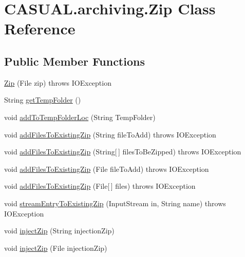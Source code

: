 \hypertarget{classCASUAL_1_1archiving_1_1Zip}{\section{C\-A\-S\-U\-A\-L.\-archiving.\-Zip Class Reference}
\label{classCASUAL_1_1archiving_1_1Zip}
}
\subsection*{Public Member Functions}
\begin{DoxyCompactItemize}
\item 
\hyperlink{classCASUAL_1_1archiving_1_1Zip_af739cb60ce5a0d3a5348cb9e679ceba7}{Zip} (File zip)  throws I\-O\-Exception 
\item 
String \hyperlink{classCASUAL_1_1archiving_1_1Zip_a0e55040227d73b64d691017a57e88c30}{get\-Temp\-Folder} ()
\item 
void \hyperlink{classCASUAL_1_1archiving_1_1Zip_aa1bf6893e99618dfc73e5e15d90a233e}{add\-To\-Temp\-Folder\-Loc} (String Temp\-Folder)
\item 
void \hyperlink{classCASUAL_1_1archiving_1_1Zip_a2a84e31123f657e9c5e6cc73bcf85fc0}{add\-Files\-To\-Existing\-Zip} (String file\-To\-Add)  throws I\-O\-Exception 
\item 
void \hyperlink{classCASUAL_1_1archiving_1_1Zip_aacdd5cd6f2847e0ee6bb77ea202ecdab}{add\-Files\-To\-Existing\-Zip} (String\mbox{[}$\,$\mbox{]} files\-To\-Be\-Zipped)  throws I\-O\-Exception 
\item 
void \hyperlink{classCASUAL_1_1archiving_1_1Zip_a9dc2f94fce74e938b6f529cdf300ad91}{add\-Files\-To\-Existing\-Zip} (File file\-To\-Add)  throws I\-O\-Exception 
\item 
void \hyperlink{classCASUAL_1_1archiving_1_1Zip_afb0e0e812a4fb259b8c4af21ece047ba}{add\-Files\-To\-Existing\-Zip} (File\mbox{[}$\,$\mbox{]} files)  throws I\-O\-Exception 
\item 
void \hyperlink{classCASUAL_1_1archiving_1_1Zip_a79c5b8d507f0b2207657968ce04d7662}{stream\-Entry\-To\-Existing\-Zip} (Input\-Stream in, String name)  throws I\-O\-Exception 
\item 
void \hyperlink{classCASUAL_1_1archiving_1_1Zip_afba344b319d35382ac45f0019135f2bb}{inject\-Zip} (String injection\-Zip)
\item 
void \hyperlink{classCASUAL_1_1archiving_1_1Zip_a793ea3d539a12d8dac7a623f98372cf7}{inject\-Zip} (File injection\-Zip)
\item 

\end{DoxyCompactItemize}
